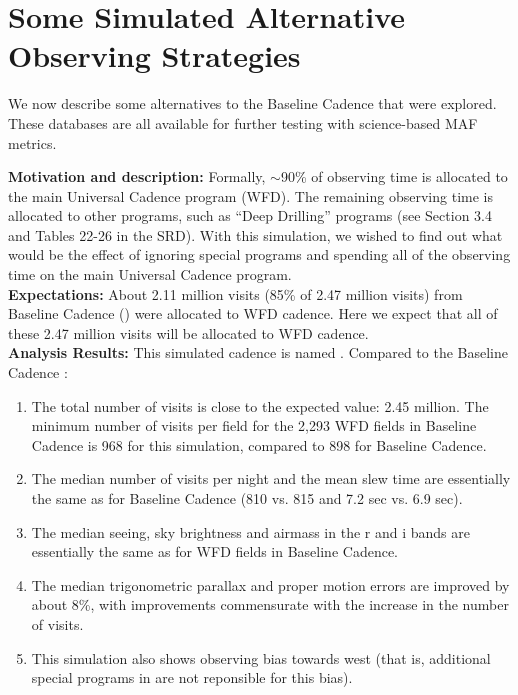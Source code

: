 \navigationbar


\section{Some Simulated Alternative Observing Strategies}
\def\secname{cadexp:alternatives}\label{sec:\secname}

We now describe some alternatives to the Baseline Cadence that were
explored. These \OpSim databases are all available for further testing
with science-based MAF metrics.



{\bf Motivation and description:} Formally, $\sim$90\% of observing
time is allocated to the main Universal Cadence program (WFD). The
remaining observing time is allocated to other programs, such as
``Deep Drilling'' programs (see Section 3.4 and Tables 22-26  in the
SRD). With this simulation, we wished to find out what would be the
effect of ignoring special programs and spending all of the observing
time on the main Universal Cadence program. \\

{\bf Expectations:} About 2.11 million visits (85\% of 2.47 million
visits) from Baseline Cadence () were allocated
to WFD cadence. Here we expect that all of these 2.47 million visits
will be allocated to WFD cadence. \\

{\bf Analysis Results:} This simulated cadence is named .
Compared to the Baseline Cadence :
\begin{enumerate}
\item The total number of visits is close to the expected value: 2.45 million.
The minimum number of visits per field for the 2,293 WFD fields in Baseline Cadence
is 968 for this simulation, compared to 898 for Baseline Cadence.
\item The median number of visits per night and the mean slew time are
essentially the same as for Baseline Cadence (810 vs. 815 and 7.2 sec vs. 6.9 sec).
\item The median seeing, sky brightness and airmass in the r and i bands are
      essentially the same as for WFD fields in Baseline Cadence.
\item The median trigonometric parallax and proper motion errors are improved by
about 8\%, with improvements commensurate with the increase in the number of visits.
\item This simulation also shows observing bias towards west (that is, additional
special programs in  are not reponsible for this bias).
\end{enumerate}


